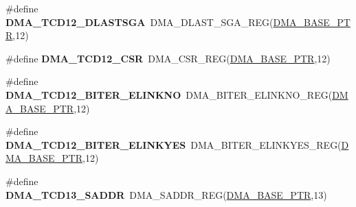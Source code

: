 \begin{DoxyCompactItemize}
\item 
\hypertarget{group___d_m_a___register___accessor___macros_ga1c61d3ecf389551728ac8271b2e53486}{}\#define {\bfseries D\+M\+A\+\_\+\+T\+C\+D12\+\_\+\+D\+L\+A\+S\+T\+S\+G\+A}~D\+M\+A\+\_\+\+D\+L\+A\+S\+T\+\_\+\+S\+G\+A\+\_\+\+R\+E\+G(\hyperlink{group___d_m_a___peripheral_ga6997fbc1b1973e9f27170217a3bd6f22}{D\+M\+A\+\_\+\+B\+A\+S\+E\+\_\+\+P\+T\+R},12)\label{group___d_m_a___register___accessor___macros_ga1c61d3ecf389551728ac8271b2e53486}

\item 
\hypertarget{group___d_m_a___register___accessor___macros_ga20541e42162680378136b1da043ba15b}{}\#define {\bfseries D\+M\+A\+\_\+\+T\+C\+D12\+\_\+\+C\+S\+R}~D\+M\+A\+\_\+\+C\+S\+R\+\_\+\+R\+E\+G(\hyperlink{group___d_m_a___peripheral_ga6997fbc1b1973e9f27170217a3bd6f22}{D\+M\+A\+\_\+\+B\+A\+S\+E\+\_\+\+P\+T\+R},12)\label{group___d_m_a___register___accessor___macros_ga20541e42162680378136b1da043ba15b}

\item 
\hypertarget{group___d_m_a___register___accessor___macros_gafbb305fbbbe14b18f2425921555a875b}{}\#define {\bfseries D\+M\+A\+\_\+\+T\+C\+D12\+\_\+\+B\+I\+T\+E\+R\+\_\+\+E\+L\+I\+N\+K\+N\+O}~D\+M\+A\+\_\+\+B\+I\+T\+E\+R\+\_\+\+E\+L\+I\+N\+K\+N\+O\+\_\+\+R\+E\+G(\hyperlink{group___d_m_a___peripheral_ga6997fbc1b1973e9f27170217a3bd6f22}{D\+M\+A\+\_\+\+B\+A\+S\+E\+\_\+\+P\+T\+R},12)\label{group___d_m_a___register___accessor___macros_gafbb305fbbbe14b18f2425921555a875b}

\item 
\hypertarget{group___d_m_a___register___accessor___macros_ga2b17649d2bc48a65938316a07ce7424f}{}\#define {\bfseries D\+M\+A\+\_\+\+T\+C\+D12\+\_\+\+B\+I\+T\+E\+R\+\_\+\+E\+L\+I\+N\+K\+Y\+E\+S}~D\+M\+A\+\_\+\+B\+I\+T\+E\+R\+\_\+\+E\+L\+I\+N\+K\+Y\+E\+S\+\_\+\+R\+E\+G(\hyperlink{group___d_m_a___peripheral_ga6997fbc1b1973e9f27170217a3bd6f22}{D\+M\+A\+\_\+\+B\+A\+S\+E\+\_\+\+P\+T\+R},12)\label{group___d_m_a___register___accessor___macros_ga2b17649d2bc48a65938316a07ce7424f}

\item 
\hypertarget{group___d_m_a___register___accessor___macros_ga5daa84539093d0893fdc44fe66a428b6}{}\#define {\bfseries D\+M\+A\+\_\+\+T\+C\+D13\+\_\+\+S\+A\+D\+D\+R}~D\+M\+A\+\_\+\+S\+A\+D\+D\+R\+\_\+\+R\+E\+G(\hyperlink{group___d_m_a___peripheral_ga6997fbc1b1973e9f27170217a3bd6f22}{D\+M\+A\+\_\+\+B\+A\+S\+E\+\_\+\+P\+T\+R},13)\label{group___d_m_a___register___accessor___macros_ga5daa84539093d0893fdc44fe66a428b6}


\end{DoxyCompactItemize}
